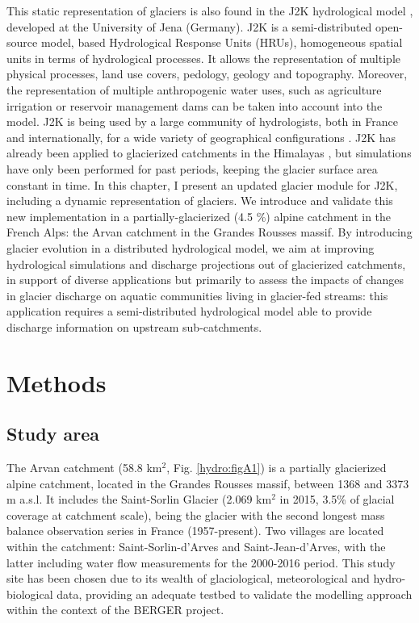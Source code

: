 This static representation of glaciers is also found in the J2K hydrological model \citep{krause_quantifying_2002}, developed at the University of Jena (Germany). J2K is a semi-distributed open-source model, based Hydrological Response Units (HRUs), homogeneous spatial units in terms of hydrological processes. It allows the representation of multiple physical processes, land use covers, pedology, geology and topography. Moreover, the representation of multiple anthropogenic water uses, such as agriculture irrigation or reservoir management dams can be taken into account into the model. J2K is being used by a large community of hydrologists, both in France and internationally, for a wide variety of geographical configurations \citep{krause_quantifying_2002, nepal_understanding_2014, braud_j2000-rhone_2017}. J2K has already been applied to glacierized catchments in the Himalayas \citep{nepal_understanding_2014}, but simulations have only been performed for past periods, keeping the glacier surface area constant in time. In this chapter, I present an updated glacier module for J2K, including a dynamic representation of glaciers. We introduce and validate this new implementation in a partially-glacierized (4.5 \%) alpine catchment in the French Alps: the Arvan catchment in the Grandes Rousses massif. By introducing glacier evolution in a distributed hydrological model, we aim at improving hydrological simulations and discharge projections out of glacierized catchments, in support of diverse applications but primarily to assess the impacts of changes in glacier discharge on aquatic communities living in glacier-fed streams: this application requires a semi-distributed hydrological model able to provide discharge information on upstream sub-catchments. 

\section{Methods}

\subsection{Study area}

The Arvan catchment (58.8 km$^{2}$, Fig. \ref{hydro:figA1}) is a partially glacierized alpine catchment, located in the Grandes Rousses massif, between 1368 and 3373 m a.s.l. It includes the Saint-Sorlin Glacier (2.069 km$^{2}$ in 2015, 3.5\% of glacial coverage at catchment scale), being the glacier with the second longest mass balance observation series in France (1957-present). Two villages are located within the catchment: Saint-Sorlin-d'Arves and Saint-Jean-d'Arves, with the latter including water flow measurements for the 2000-2016 period. This study site has been chosen due to its wealth of glaciological, meteorological and hydro-biological data, providing an adequate testbed to validate the modelling approach within the context of the BERGER project.

